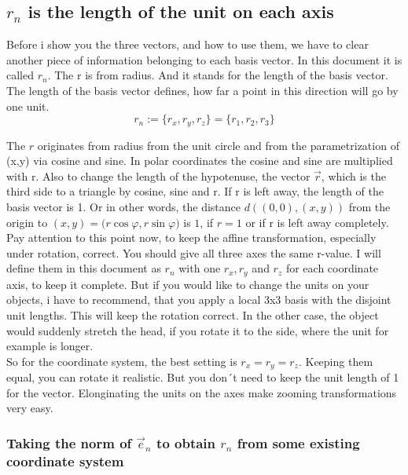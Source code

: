 \documentclass[a4paper]{article}
\begin{document}
\subsection{$r_{n}$ is the length of the unit on each axis}

Before i show you the three vectors, and how to use them, we have to clear another piece of information belonging to each
basis vector. In this document it is called $r_{n}$. The r is from radius. And it stands for the length of the basis vector.
The length of the basis vector defines, how far a point in this direction will go by one unit.\\
\begin{displaymath}
r_{n} := \{ r_{x}, r_{y}, r_{z} \} = \{ r_{1}, r_{2}, r_{3} \}
\end{displaymath}

The $r$ originates from radius from the unit circle and from the parametrization of (x,y) via cosine and sine. 
In polar coordinates the cosine and sine are multiplied with r. Also to change the length of the hypotenuse, 
the vector $\vec{r}$, which is the third side to a triangle by cosine, sine and r. 
If r is left away, the length of the basis vector is 1. Or in other words, the distance $d((0,0),(x,y))$ from the origin to $(x,y)=($$r \cos \varphi$$, $$r \sin \varphi$$)$ is $1$, if $r=1$ or if r is left away completely.\\

Pay attention to this point now, to keep the affine transformation, especially under rotation, correct. You should give all three
axes the same r-value. I will define them in this document as $r_{n}$ with one $r_x, r_y$ and $r_z$ for each coordinate axis,
to keep it complete. But if you would like to change the units on your objects, i have to recommend, that you apply a local
3x3 basis with the disjoint unit lengths. This will keep the rotation correct. In the other case, the object would suddenly
stretch the head, if you rotate it to the side, where the unit for example is longer.\\

So for the coordinate system, the best setting is $r_x = r_y = r_z$. Keeping them equal, you can rotate it realistic. But you
don´t need to keep the unit length of 1 for the vector. Elonginating the units on the axes make zooming transformations very
easy.\\

\subsubsection{Taking the norm of $\vec{e}_n$ to obtain $r_n$ from some existing coordinate system}
\end{document}
